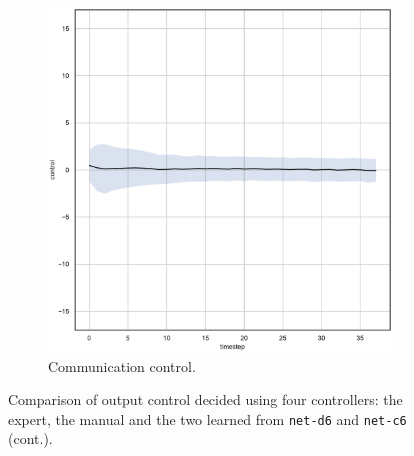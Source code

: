 \begin{figure}[!htb]
\begin{center}
\begin{subfigure}[h]{0.35\textwidth}
			\includegraphics[width=\textwidth]{contents/images/net-c6/control-overtime-learned_communication}
			\caption{Communication control.}
		\end{subfigure}
	\end{center}
	\vspace{-0.5cm}
	\caption[]{Comparison of output control decided using four controllers: the 
		expert, the manual and the two learned from \texttt{net-d6} and 
		\texttt{net-c6} (cont.).}
	\label{fig:net-c6control}
\end{figure}

